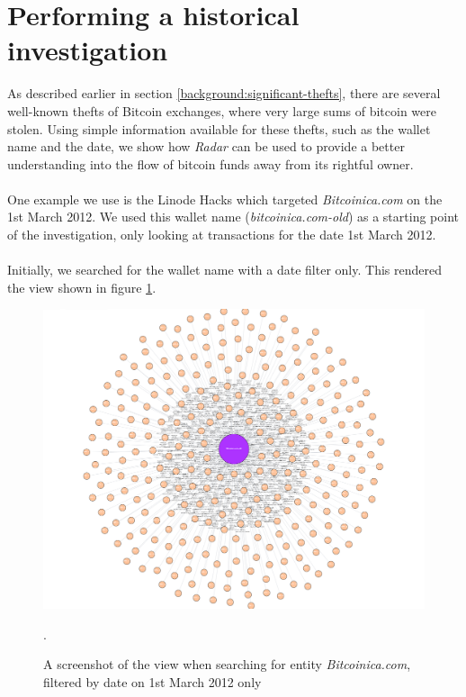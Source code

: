 \section{Performing a historical investigation}\label{evaluation:historical-investigation}
As described earlier in section \ref{background:significant-thefts}, there are several well-known thefts of Bitcoin exchanges, where very large sums of bitcoin were stolen. Using simple information available for these thefts, such as the wallet name and the date, we show how \textit{Radar} can be used to provide a better understanding into the flow of bitcoin funds away from its rightful owner.
\\\\
One example we use is the Linode Hacks which targeted \textit{Bitcoinica.com} on the 1st March 2012. We used this wallet name (\textit{bitcoinica.com-old}) as a starting point of the investigation, only looking at transactions for the date 1st March 2012. 
\\\\
Initially, we searched for the wallet name with a date filter only. This rendered the view shown in figure \ref{fig:theft-no-filter}.

\begin{figure}[h!]
  \centering
  \includegraphics[width = 15cm]{./figures/theft-all-txs-1st-march}\\[0.5cm]
  \caption{A screenshot of the view when searching for entity \textit{Bitcoinica.com}, filtered by date on 1st March 2012 only}.
  \label{fig:theft-no-filter}
\end{figure}

